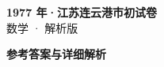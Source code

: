 \documentclass[zihao=-4, a4paper]{ctexart}
\begin{document}
\begin{center}
  {\Large\bfseries 1977 年·江苏连云港市初试卷}\\[4pt]
  {\large 数学 · 解析版}
\end{center}
\medskip
{}

\clearpage
{}
\begin{center}{\Large\bfseries 参考答案与详细解析}\end{center}
\medskip

\end{document}
